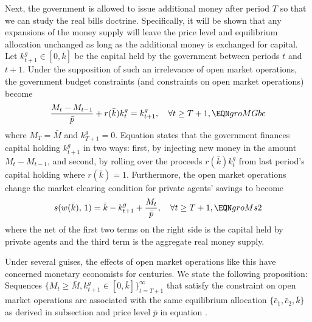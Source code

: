 Next, the government is allowed to issue additional
money after period $T$ so that we can study   
the real bills doctrine. Specifically, it will be
shown that any expansions of 
the money supply
will leave the price level 
and equilibrium allocation
unchanged as long as the 
additional money is exchanged for capital. Let 
$k^g_{t+1}\in[0,\bar k]$ be the capital held by the
government between periods $t$ and $t+1$. Under the 
supposition of such an irrelevance of open market 
operations, the government budget constraints (and
constraints on open market operations) become
$$ {M_t - M_{t-1} \over  \bar p} + r(\bar k) k^g_t 
        = k^g_{t+1}, \quad \forall t \geq T+1, \EQN groMGbc $$
where $M_T=\bar M$ and $k^g_{T+1}=0$.
Equation  states that the government finances 
capital holding $k^g_{t+1}$ in two ways:
first, by injecting new money in the amount $M_t-M_{t-1}$,
and second, by rolling over the proceeds $r(\bar k) k^g_t$
from last period's capital holding where $r(\bar k)=1$.
Furthermore, the open market operations change the market 
clearing condition  for private agents' savings 
to become
$$ s(w(\bar k),\, 1)
        = \bar k - k^g_{t+1} + {M_t \over \bar p},
\quad \forall t \geq T+1, \EQN groMs2
$$
where the net of the first two terms on the right side is 
the capital held by private agents and the third
term is the aggregate real money supply.

 Under several guises, the effects of open market operations
like this have concerned monetary economists for centuries.
We  state the following proposition:
\medskip
{}   
Sequences $\{M_t\geq \bar M, k^g_{t+1}\in [0, \bar k]\}_{t=T+1}^\infty$
 that satisfy the constraint
 on open market operations  are associated with the 
same equilibrium allocation $\{\bar c_1, \bar c_2, \bar k\}$ as
derived in subsection  and
price level $\bar p$ in equation .


